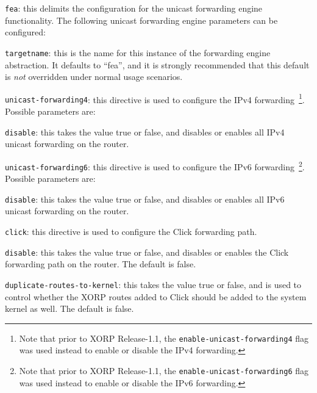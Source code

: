 \begin{description}
\item{\tt fea}: this delimits the configuration for the unicast
  forwarding engine functionality. 
  The following unicast forwarding engine parameters can be configured:
\begin{description}
\item{\tt targetname}: this is the name for this instance of the
  forwarding engine abstraction.  It defaults to ``{\stt fea}'', and
  it is strongly recommended that this default is {\it not} overridden
  under normal usage scenarios.
\end{description}
\item{\tt unicast-forwarding4}: this directive is used to configure the IPv4
  forwarding~\footnote{Note that prior to XORP Release-1.1, the
  {\tt enable-unicast-forwarding4} flag was used instead to enable or disable
  the IPv4 forwarding.}. Possible parameters are:
\begin{description}
\item{\tt disable}: this takes the value {\stt true} or {\stt false},
  and disables or enables all IPv4 unicast forwarding on the router.
\end{description}
\item{\tt unicast-forwarding6}: this directive is used to configure the IPv6
  forwarding~\footnote{Note that prior to XORP Release-1.1, the
  {\tt enable-unicast-forwarding6} flag was used instead to enable or disable
  the IPv6 forwarding.}. Possible parameters are:
\begin{description}
\item{\tt disable}: this takes the value {\stt true} or {\stt false},
  and disables or enables all IPv6 unicast forwarding on the router.
\end{description}

\item{\tt click}: this directive is used to configure the Click
  forwarding path.
\begin{description}
\item{\tt disable}: this takes the value {\stt true} or {\stt false},
  and disables or enables the Click forwarding path on the router. The
  default is {\stt false}.
\item{\tt duplicate-routes-to-kernel}: this takes the value {\stt true}
  or {\stt false}, and is used to control whether the XORP routes added
  to Click should be added to the system kernel as well. The default is
  {\stt false}.


\end{description}
\end{description}

